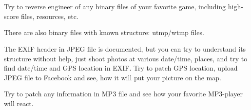 \chapter{\ESph{}\PTBRph{}\PLph{}\ITAph{}
\NLph{}}


\EN{}
\EN{}\RU{}
\EN{}
\EN{}\RU{}
\EN{}\RU{}

\ifdefined\ENGLISH
\section{\Exercise}

Try to reverse engineer of any binary files of your favorite game, including high-score files, resources, etc.

There are also binary files with known structure: utmp/wtmp files.

The EXIF header in JPEG file is documented, but you can try to understand its structure without help, just shoot photos
at various date/time, places, and try to find date/time and GPS location in EXIF.
Try to patch GPS location, upload JPEG file to Facebook and see, how it will put your picture on the map.

Try to patch any information in MP3 file and see how your favorite MP3-player will react.
\fi %

